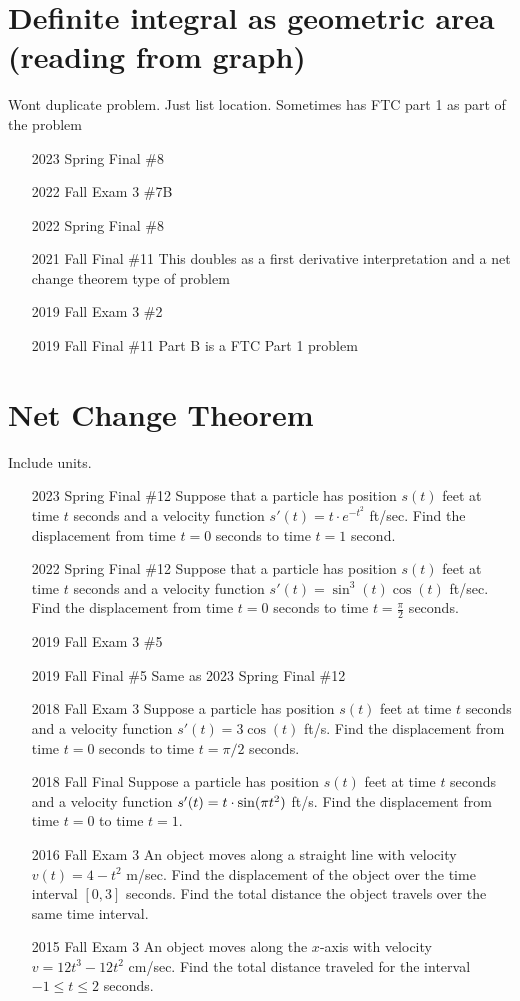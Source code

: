 \documentclass[10pt]{scrartcl}
\theoremstyle{definition}
\begin{document}
\section{Definite integral as geometric area (reading from graph)}
Wont duplicate problem. Just list location.
Sometimes has FTC part 1 as part of the problem
\begin{enumerate}
\item [2023 Spring Final \#8]
\item [2022 Fall Exam 3 \#7B]
\item [2022 Spring Final \#8]
\item [2021 Fall Final \#11] This doubles as a first derivative interpretation and a net change theorem type of problem
\item [2019 Fall Exam 3 \#2]
\item [2019 Fall Final \#11] Part B is a FTC Part 1 problem
\end{enumerate}

\section{Net Change Theorem}
Include units.

\begin{enumerate}
\item [2023 Spring Final \#12] Suppose that a particle has position $s(t)$ feet at time $t$ seconds and a velocity function $s'(t) = t \cdot e^{-t^2}$ ft/sec. Find the displacement from time $t=0$ seconds to time $t=1$ second.
\item [2022 Spring Final \#12] Suppose that a particle has position $s(t)$ feet at time $t$ seconds and a velocity function $s'(t) = \sin^3(t)\cos(t)$ ft/sec. Find the displacement from time $t=0$ seconds to time $t=\frac\pi2$ seconds.
\item [2019 Fall Exam 3 \#5]
\item [2019 Fall Final \#5] Same as 2023 Spring Final \#12
\item [2018 Fall Exam 3] Suppose a particle has position $s(t)$ feet at time $t$ seconds and a velocity function $s'(t) = 3\cos(t)$ ft/s. Find the displacement from time $t = 0$ seconds to time $t = \pi/2$ seconds.
\item [2018 Fall Final] Suppose a particle has position $s(t)$ feet at time $t$ seconds and a velocity function $s'(t) = t \cdot \sine(\pi t^2)$ ft/s. Find the displacement from time $t=0$ to time $t = 1$.
\item [2016 Fall Exam 3] An object moves along a straight line with velocity $v(t) = 4 - t^2$ m/sec. Find the displacement of the object over the time interval $[0, 3]$ seconds. Find the total distance the object travels over the same time interval.
\item [2015 Fall Exam 3] An object moves along the $x$-axis with velocity $v = 12t^3 - 12t^2 $ \si{cm/sec}. Find the total distance traveled for the interval $-1 \le t \le 2$ seconds.
\end{enumerate}
\end{document}
